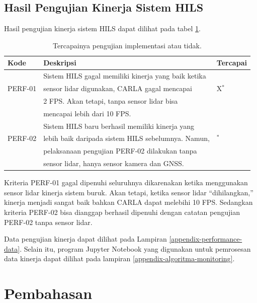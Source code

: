 \subsection{Hasil Pengujian Kinerja Sistem HILS}

Hasil pengujian kinerja sistem HILS dapat dilihat pada tabel \ref{chapter-4-tbl-perf-criteria-result}.

\begin{table}[!htbp]
	\begin{center}
		\begin{tabular}{|l|l|l|}
			\hline
			\textbf{Kode} & \textbf{Deskripsi}                                  & \textbf{Tercapai} \\
			\hline
			              & Sistem HILS gagal memiliki kinerja yang baik ketika &                   \\
			PERF-01       & sensor lidar digunakan, CARLA gagal mencapai        & X$^*$             \\
			              & 2 FPS. Akan tetapi, tanpa sensor lidar bisa         &                   \\
			              & mencapai lebih dari 10 FPS.                         &                   \\
			\hline
			              & Sistem HILS baru berhasil memiliki kinerja yang     &                   \\
			PERF-02       & lebih baik daripada sistem HILS sebelumnya. Namun,  & \checkmark$^*$    \\
			              & pelaksanaan pengujian PERF-02 dilakukan tanpa       &                   \\
			              & sensor lidar, hanya sensor kamera dan GNSS.         &                   \\
			\hline
		\end{tabular}
	\end{center}

	\caption{Tercapainya pengujian implementasi atau tidak.}
	\label{chapter-4-tbl-perf-criteria-result}
\end{table}

Kriteria PERF-01 gagal dipenuhi seluruhnya dikarenakan ketika menggunakan sensor
lidar kinerja sistem buruk. Akan tetapi, ketika sensor lidar ``dihilangkan,''
kinerja menjadi sangat baik bahkan CARLA dapat melebihi 10 FPS. Sedangkan
kriteria PERF-02 bisa dianggap berhasil dipenuhi dengan catatan pengujian
PERF-02 tanpa sensor lidar.

Data pengujian kinerja dapat dilihat pada Lampiran
\ref{appendix-performance-data}. Selain itu, program Jupyter Notebook yang
digunakan untuk pemrosesan data kinerja dapat dilihat pada lampiran
\ref{appendix-algoritma-monitoring}.

\section{Pembahasan}
\blindtext
